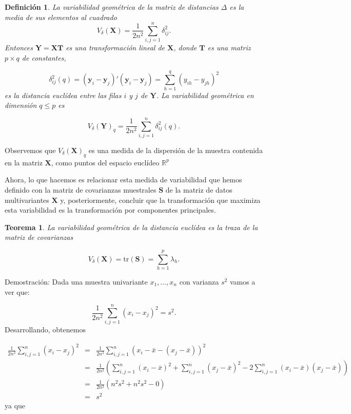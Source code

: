 \documentclass[tfg,cienciasbased,lot,lof,covers,final,overleaf,nocopyright]{tfgtfmthesisuam}
\newtheorem{defi}{Definición}[chapter]
\newtheorem{teor}{Teorema}[chapter]
\begin{document}
\begin{defi}
    La variabilidad geométrica de la matriz de distancias $\Delta$ es la media de sus elementos al cuadrado 
    $$V_{\delta}(\mathbf{X}) = \frac{1}{2n^2}\sum_{i,j=1}^{n} \delta_{ij}^{2}.$$
    Entonces $\mathbf{Y} = \mathbf{XT}$ es una transformación lineal de $\mathbf{X}$, donde $\mathbf{T}$ es una matriz $p \times q$ de constantes, 
    
    $$\delta_{ij}^2(q) = (\mathbf{y}_i - \mathbf{y}_j)'(\mathbf{y}_i - \mathbf{y}_j) = \sum_{h=1}^{q}(y_{ih} - y_{jh})^2$$
    es la distancia euclídea entre las filas $i$ y $j$ de $\mathbf{Y}$. La variabilidad geométrica en dimensión $q \leq p$ es 
    
    $$V_{\delta}(\mathbf{Y})_q = \frac{1}{2n^2}\sum_{i,j=1}^{n} \delta_{ij}^{2}(q).$$
\end{defi}

Observemos que $V_{\delta}(\mathbf{X})_q$ es una medida de la dispersión de la muestra contenida en la matriz $\mathbf{X}$, como puntos del espacio euclídeo $\mathbb{R}^p$

Ahora, lo que hacemos es relacionar esta medida de variabilidad que hemos definido con la matriz de covarianzas muestrales $\mathbf{S}$ de la matriz de datos multivariantes $\mathbf{X}$ y, posteriormente, concluir que la transformación que maximiza esta variabilidad es la transformación por componentes principales. 

\begin{teor}
    La variabilidad geométrica de la distancia euclídea es la traza de la matriz de covarianzas
    
    $$V_{\delta}(\mathbf{X}) = \mbox{tr}(\mathbf{S}) = \sum_{h=1}^p \lambda_h.$$
\end{teor}
Demostración:
Dada una muestra univariante $x_1, \ldots, x_n$ con varianza $s^2$ vamos a ver que:

\begin{equation*}
    \frac{1}{2n^2}\sum_{i,j=1}^{n}(x_i-x_j)^2=s^2.
\end{equation*}
Desarrollando, obtenemos

\begin{eqnarray*}
    \frac{1}{2n^2}\sum_{i,j=1}^{n}(x_i-x_j)^2 & = &\frac{1}{2n^2}\sum_{i,j=1}^{n}(x_i-\bar{x}-(x_j-\bar{x}))^2\\
    & = &\frac{1}{2n^2}(\sum_{i,j=1}^{n}(x_i-\bar{x})^2 +  \sum_{i,j=1}^{n}(x_j-\bar{x})^2 - 2 \sum_{i,j=1}^{n}(x_i-\bar{x})(x_j-\bar{x}))\\
    & = &\frac{1}{2n^2}(n^2s^2+n^2s^2-0)\\
    & = &s^2
\end{eqnarray*}
ya que 
\end{document}

